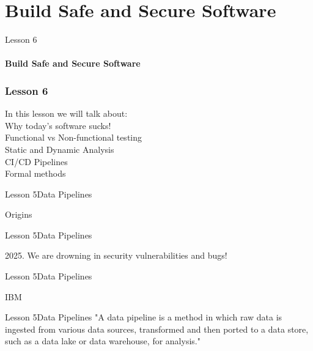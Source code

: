 \documentclass[aspectratio=1610]{beamer}
\begin{document}
\section{Build Safe and Secure Software}

\begin{frame}
\begin{center}
\Huge Lesson 6\\~\\
\textbf{Build Safe and Secure Software}
\end{center}
\end{frame}


\begin{frame}
\frametitle{Lesson 6}
\Huge In this lesson we will talk about:\\
\huge
 \alert{Why today's software sucks!}\\
 \alert{Functional vs Non-functional testing}\\
 \alert{Static and Dynamic Analysis}\\
 \alert{CI/CD Pipelines}\\
 \alert{Formal methods}\\
\end{frame}


\begin{frame}{Lesson 5}{Data Pipelines}
\Huge
\begin{center}
Origins
\end{center}
\end{frame}


\begin{frame}{Lesson 5}{Data Pipelines}
\Huge
\begin{center}
2025. We are drowning in security vulnerabilities and bugs! 
\end{center}
\end{frame}



\begin{frame}{Lesson 5}{Data Pipelines}
\Huge
\begin{center}
 IBM
\end{center}
\end{frame}

\begin{frame}{Lesson 5}{Data Pipelines}
\LARGE
"A data pipeline is a method in which raw data is ingested from 
various data sources, transformed and then ported to a data store, 
such as a data lake or data warehouse, for analysis."
\end{frame}
\end{document}
